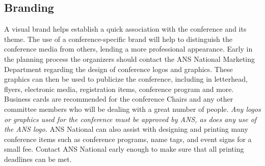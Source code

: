 \documentclass[12pt]{article}
\begin{document}
\subsection{Branding}
A visual brand helps establish a quick association with the conference and its theme.
The use of a conference-specific brand will help to distinguish the conference media from others, lending a more professional appearance.
Early in the planning process the organizers should contact the ANS National Marketing Department regarding the design of conference logos and graphics.
These graphics can then be used to publicize the conference, including in letterhead, flyers, electronic media, registration items, conference program and more.
Business cards are recommended for the conference Chairs and any other committee members who will be dealing with a great number of people.
\emph{Any logos or graphics used for the conference must be approved by ANS, as does any use of the ANS logo.}
ANS National can also assist with designing and printing many conference items such as conference programs, name tags, and event signs for a small fee.
Contact ANS National early enough to make sure that all printing deadlines can be met.

\clearpage
\end{document}
